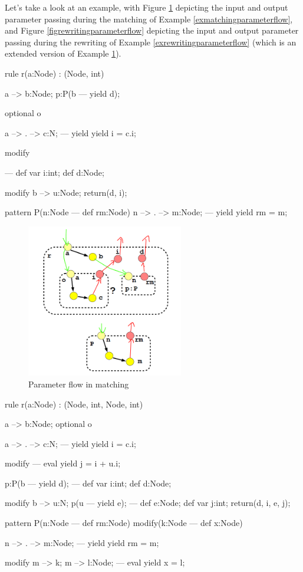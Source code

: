 Let's take a look at an example, with Figure \ref{figmatchingparameterflow} depicting the input and output parameter passing during the matching of Example \ref{exmatchingparameterflow}, and Figure \ref{figrewritingparameterflow} depicting the input and output parameter passing during the rewriting of Example \ref{exrewritingparameterflow} (which is an extended version of Example \ref{figmatchingparameterflow}).

\begin{example}
  \begin{grgen}
rule r(a:Node) : (Node, int)
{
  a --> b:Node;
  p:P(b --- yield d);

  optional o {
    a --> . --> c:N;
  ---
    yield { yield i = c.i; }

    modify {
    }
  }
---	
  def var i:int;
  def d:Node;

  modify {
    b --> u:Node;
    return(d, i);
  }
}
pattern P(n:Node --- def rm:Node)
{
  n --> . --> m:Node;
---
  yield { yield rm = m; }
}
  \end{grgen}
\end{example}\label{exmatchingparameterflow}

\begin{figure}[hptb]
  \centering
  \includegraphics[width=0.61\textwidth]{fig/MatchAndParameterFlowAnnotated}
  \caption{Parameter flow in matching}
  \label{figmatchingparameterflow}
\end{figure}

\begin{example}
  \begin{grgen}
rule r(a:Node) : (Node, int, Node, int) {
  a --> b:Node;
  optional o {
    a --> . --> c:N;
  ---
    yield {	yield i = c.i; }

    modify {
    ---
      eval { yield j = i + u.i; }
    }
  }
  p:P(b --- yield d);
---	
  def var i:int;
  def d:Node;

  modify {
    b --> u:N;
    p(u --- yield e);
  ---
    def e:Node; def var j:int;
    return(d, i, e, j);
  }
}
pattern P(n:Node --- def rm:Node) modify(k:Node --- def x:Node) {
  n --> . --> m:Node;
---
  yield {	yield rm = m; }

  modify {
    m --> k; m --> l:Node;
  ---
    eval { yield x = l; }
  }
}
  \end{grgen}
\end{example}\label{exrewritingparameterflow}

